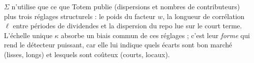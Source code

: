 \begin{insight}
$\Sigma$ n'utilise que ce que Totem publie (dispersions et nombres de contributeurs) plus trois réglages structurels :
le poids du facteur $w$, la longueur de corrélation $\ell$ entre périodes de dividendes et la dispersion du repo lue sur
le court terme. L'échelle unique $\kappa$ absorbe un biais commun de ces réglages ; c'est leur \emph{forme} qui rend le
détecteur puissant, car elle lui indique quels écarts sont bon marché (lisses, longs) et lesquels sont coûteux (courts,
locaux).
\end{insight}
